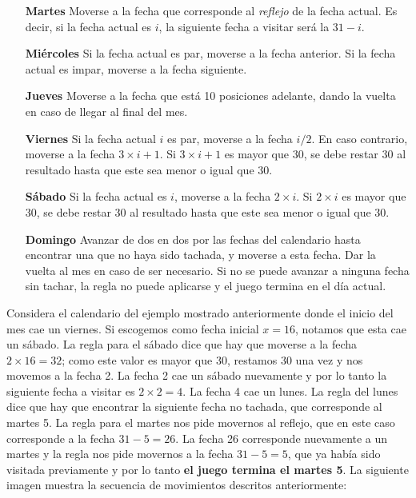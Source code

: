 \documentclass{oci}
\begin{document}
\begin{problemDescription}
\begin{itemize}
    \item[\bf Martes] Moverse a la fecha que corresponde al \emph{reflejo} de la fecha actual.
    Es decir, si la fecha actual es $i$, la siguiente fecha a visitar será la $31 - i$.

    \item[\bf Miércoles] Si la fecha actual es par, moverse a la fecha anterior.
    Si la fecha actual es impar, moverse a la fecha siguiente.

    \item[\bf Jueves] Moverse a la fecha que está 10 posiciones adelante, dando la vuelta en caso de
    llegar al final del mes.

    \item[\bf Viernes] Si la fecha actual $i$ es par, moverse a la fecha $i/2$.
    En caso contrario, moverse a la fecha $3\times i + 1$.
    Si $3\times i + 1$ es mayor que 30, se debe restar 30 al resultado hasta que este sea menor o igual que 30.

    \item[\bf Sábado] Si la fecha actual es $i$, moverse a la fecha $2\times i$.
    Si $2\times i$ es mayor que 30, se debe restar 30 al resultado hasta que este sea menor o igual que 30.

    \item[\bf Domingo] Avanzar de dos en dos por las fechas del calendario hasta encontrar una que no haya sido tachada, y moverse a esta fecha.
    Dar la vuelta al mes en caso de ser necesario.
    Si no se puede avanzar a ninguna fecha sin tachar, la regla no puede aplicarse y el juego termina en el día actual.
  \end{itemize}

  Considera el calendario del ejemplo mostrado anteriormente donde el inicio del mes cae un viernes.
  Si escogemos como fecha inicial $x=16$, notamos que esta cae un sábado.
  La regla para el sábado dice que hay que moverse a la fecha $2\times 16 = 32$; como este valor es mayor que 30,
  restamos 30 una vez y nos movemos a la fecha 2.
  La fecha 2 cae un sábado nuevamente y por lo tanto la siguiente fecha a visitar es $2\times 2=4$.
  La fecha 4 cae un lunes. La regla del lunes dice que hay que encontrar la siguiente fecha no tachada, que corresponde al martes 5.
  La regla para el martes nos pide movernos al reflejo, que en este caso corresponde a la fecha $31 - 5 = 26$.
  La fecha 26 corresponde nuevamente a un martes y la regla nos pide movernos a la fecha $31 - 5 = 5$, que ya había
  sido visitada previamente y por lo tanto \textbf{el juego termina el martes 5}.
  La siguiente imagen muestra la secuencia de movimientos descritos anteriormente:


\end{problemDescription}
\end{document}
